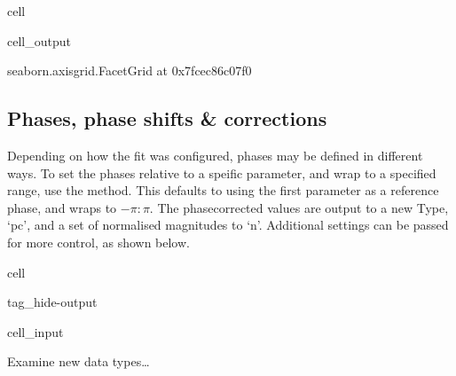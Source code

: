 \documentclass[letterpaper,table,10pt,english]{jupyterBook}
\begin{document}
\begin{sphinxuseclass}{cell}
\begin{sphinxVerbatimOutput}
\begin{sphinxuseclass}{cell_output}
\begin{sphinxVerbatim}[commandchars=\\\{\}]
\PYGZlt{}seaborn.axisgrid.FacetGrid at 0x7fcec86c07f0\PYGZgt{}
\end{sphinxVerbatim}

\noindent{}

\end{sphinxuseclass}\end{sphinxVerbatimOutput}

\end{sphinxuseclass}

\subsection{Phases, phase shifts \& corrections}
\label{\detokenize{part2/case-study-OCS_290723:phases-phase-shifts-corrections}}
\sphinxAtStartPar
Depending on how the fit was configured, phases may be defined in different ways. To set the phases relative to a speific parameter, and wrap to a specified range, use the  method. This defaults to using the first parameter as a reference phase, and wraps to \(-\pi:\pi\). The phase\sphinxhyphen{}corrected values are output to a new Type, ‘pc’, and a set of normalised magnitudes to ‘n’. Additional settings can be passed for more control, as shown below.

\begin{sphinxuseclass}{cell}
\begin{sphinxuseclass}{tag_hide-output}\begin{sphinxVerbatimInput}

\begin{sphinxuseclass}{cell_input}
\begin{sphinxVerbatim}[commandchars=\\\{\}]
 
\end{sphinxVerbatim}

\end{sphinxuseclass}\end{sphinxVerbatimInput}

\end{sphinxuseclass}
\end{sphinxuseclass}
\sphinxAtStartPar
Examine new data types…
\end{document}
